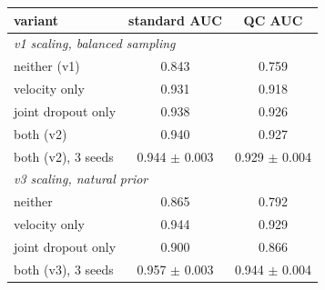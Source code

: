 \begin{tabular}{lcc}
\toprule
variant & standard AUC & QC AUC \\
\midrule
\multicolumn{3}{l}{\emph{v1 scaling, balanced sampling}} \\
\quad neither (v1) & 0.843 & 0.759 \\
\quad velocity only & 0.931 & 0.918 \\
\quad joint dropout only & 0.938 & 0.926 \\
\quad both (v2) & 0.940 & 0.927 \\
\quad both (v2), 3 seeds & 0.944 $\pm$ 0.003 & 0.929 $\pm$ 0.004 \\
\midrule
\multicolumn{3}{l}{\emph{v3 scaling, natural prior}} \\
\quad neither & 0.865 & 0.792 \\
\quad velocity only & 0.944 & 0.929 \\
\quad joint dropout only & 0.900 & 0.866 \\
\quad both (v3), 3 seeds & 0.957 $\pm$ 0.003 & 0.944 $\pm$ 0.004 \\
\bottomrule
\end{tabular}

